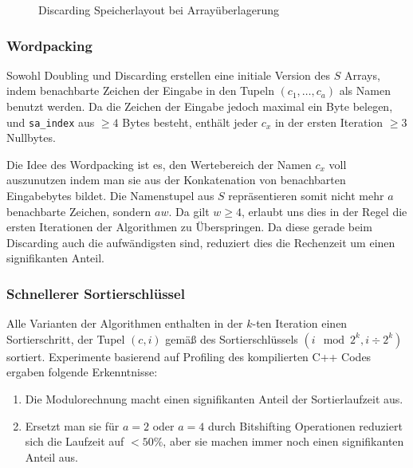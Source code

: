 \begin{figure}
\caption{Discarding Speicherlayout bei Arrayüberlagerung}
\label{fig:doubling:opt:discardlagerung}
\end{figure}

\subsubsection{Wordpacking}

Sowohl Doubling und Discarding erstellen eine initiale Version des $S$ Arrays, indem benachbarte Zeichen der Eingabe in den Tupeln $(c_1, \dots, c_a)$ als Namen benutzt werden. Da die Zeichen der Eingabe jedoch maximal ein Byte belegen, und \texttt{sa\_index} aus $\ge 4$ Bytes besteht, enthält jeder $c_x$ in der ersten Iteration $\ge 3$ Nullbytes.

Die Idee des Wordpacking ist es, den Wertebereich der Namen $c_x$ voll auszunutzen indem man sie aus der Konkatenation von benachbarten Eingabebytes bildet. Die Namenstupel aus $S$ repräsentieren somit nicht mehr $a$ benachbarte Zeichen, sondern $aw$. Da gilt $w \ge 4$, erlaubt uns dies in der Regel die ersten Iterationen der Algorithmen zu Überspringen. Da diese gerade beim Discarding auch die aufwändigsten sind, reduziert dies die Rechenzeit um einen signifikanten Anteil.

\subsubsection{Schnellerer Sortierschlüssel}

Alle Varianten der Algorithmen enthalten in der $k$-ten Iteration einen Sortierschritt, der Tupel $(c, i)$ gemäß des Sortierschlüssels $(i \mod 2^k, i \div 2^k)$ sortiert. Experimente basierend auf Profiling des kompilierten C++ Codes ergaben folgende Erkenntnisse:

\begin{enumerate}
\item Die Modulorechnung macht einen signifikanten Anteil der Sortierlaufzeit aus.
\item Ersetzt man sie für $a = 2$ oder $a = 4$ durch Bitshifting Operationen reduziert sich die Laufzeit auf $< 50\%$, aber sie machen immer noch einen signifikanten Anteil aus.
\end{enumerate}

